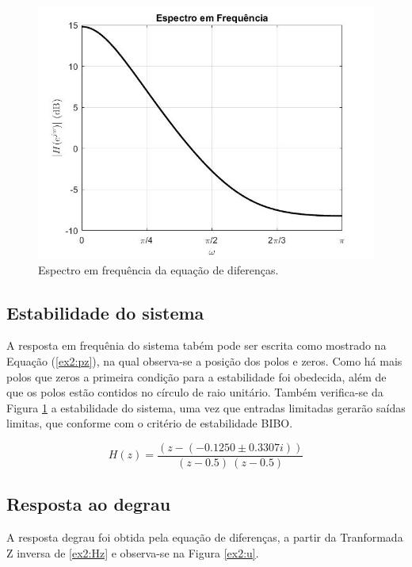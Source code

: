\documentclass[a4paper,12pt,oneside,openany,table,xcdraw]{article}
\begin{document}
\vspace{0.4cm}
\begin{figure}[H]
\centering
\includegraphics[width=14cm]{ex2-Hz}
\caption{Espectro em frequência da equação de diferenças.}
\label{ex2:H}
\end{figure}

\vspace{0.4cm}
\subsection{Estabilidade do sistema}
A resposta em frequênia do sistema tabém pode ser escrita como mostrado na Equação (\ref{ex2:pz}), na qual observa-se a posição dos polos e zeros. Como há mais polos que zeros a primeira condição para a estabilidade foi obedecida, além de que os polos estão contidos no círculo de raio unitário. Também verifica-se da Figura  \ref{ex2:H} a estabilidade do sistema, uma vez que entradas limitadas gerarão saídas limitas, que conforme com o critério de estabilidade BIBO.

\begin{equation} \label{ex2:pz}
H(z) = \dfrac{(z-(-0.1250 \pm 0.3307i))}{(z-0.5)\ (z-0.5)}
\end{equation}
 
\vspace{0.5cm}
\subsection{Resposta ao degrau}
A resposta degrau foi obtida pela equação de diferenças, a partir da Tranformada Z inversa de \ref{ex2:Hz} e observa-se na Figura \ref{ex2:u}.
\end{document}
